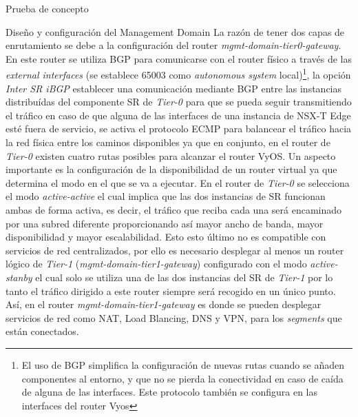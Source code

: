 \begin{section}{Prueba de concepto}
\begin{subsection}{Diseño y configuración del Management Domain}
    La razón de tener dos capas de enrutamiento se debe a la configuración del router \textit{mgmt-domain-tier0-gateway}. En este router se utiliza BGP para comunicarse con el router físico a través de las \textit{external interfaces} (se establece 65003 como \textit{autonomous system} local)\footnote{El uso de BGP simplifica la configuración de nuevas rutas cuando se añaden componentes al entorno, y que no se pierda la conectividad en caso de caída de alguna de las interfaces. Este protocolo también se configura en las interfaces del router Vyos}, la opción \textit{Inter SR iBGP} establecer una comunicación mediante BGP entre las instancias distribuídas del componente SR de \textit{Tier-0} para que se pueda seguir transmitiendo el tráfico en caso de que alguna de las interfaces de una instancia de NSX-T Edge esté fuera de servicio, se activa el protocolo ECMP para balancear el tráfico hacia la red física entre los caminos disponibles ya que en conjunto, en el router de \textit{Tier-0} existen cuatro rutas posibles para alcanzar el router VyOS. Un aspecto importante es la configuración de la disponibilidad de un router virtual ya que determina el modo en el que se va a ejecutar. En el router de \textit{Tier-0} se selecciona el modo \textit{active-active} el cual implica que las dos instancias de SR funcionan ambas de forma activa, es decir, el tráfico que reciba cada una será encaminado por una subred diferente proporcionando así mayor ancho de banda, mayor disponibilidad y mayor escalabilidad. Esto esto último no es compatible con servicios de red centralizados, por ello es necesario desplegar al menos un router lógico de \textit{Tier-1} (\textit{mgmt-domain-tier1-gateway}) configurado con el modo \textit{active-stanby} el cual solo se utiliza una de las dos instancias del SR de \textit{Tier-1} por lo tanto el tráfico dirigido a este router siempre será recogido en un único punto. Así, en el router \textit{mgmt-domain-tier1-gateway} es donde se pueden desplegar servicios de red como NAT, Load Blancing, DNS y VPN, para los \textit{segments} que están conectados.
    
    

\end{subsection}
\end{section}

